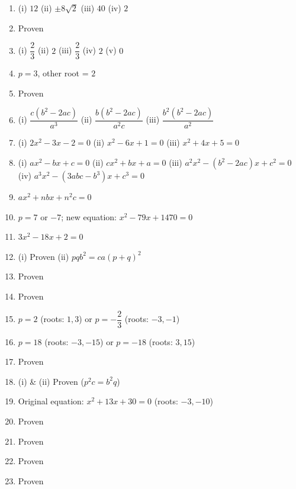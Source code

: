 \documentclass[12pt,a4paper]{article}
\begin{document}
	\begin{enumerate}
		\item (i) $12$ \quad (ii) $\pm 8\sqrt{2}$ \quad (iii) $40$ \quad (iv) $2$
		\item Proven
		\item (i) $\dfrac{2}{3}$ \quad (ii) $2$ \quad (iii) $\dfrac{2}{3}$ \quad (iv) $2$ \quad (v) $0$
		\item $p = 3$, other root = $2$
		\item Proven
		\item (i) $\dfrac{c(b^2 - 2ac)}{a^3}$ \quad (ii) $\dfrac{b(b^2 - 2ac)}{a^2c}$ \quad (iii) $\dfrac{b^2(b^2 - 2ac)}{a^2}$
		\item (i) $2x^2 - 3x - 2 = 0$ \quad (ii) $x^2 - 6x + 1 = 0$ \quad (iii) $x^2 + 4x + 5 = 0$
		\item (i) $ax^2 - bx + c = 0$ \quad (ii) $cx^2 + bx + a = 0$ \quad (iii) $a^2x^2 - (b^2 - 2ac)x + c^2 = 0$ \quad (iv) $a^3x^2 - (3abc - b^3)x + c^3 = 0$
		\item $ax^2 + nbx + n^2c = 0$
		\item $p = 7$ or $-7$; new equation: $x^2 - 79x + 1470 = 0$
		\item $3x^2 - 18x + 2 = 0$
		\item (i) Proven \quad (ii) $pqb^2 = ca(p + q)^2$
		\item Proven
		\item Proven
		\item $p = 2$ (roots: $1, 3$) or $p = -\dfrac{2}{3}$ (roots: $-3, -1$)
		\item $p = 18$ (roots: $-3, -15$) or $p = -18$ (roots: $3, 15$)
		\item Proven
		\item (i) \& (ii) Proven ($p^2c = b^2q$)
		\item Original equation: $x^2 + 13x + 30 = 0$ (roots: $-3, -10$)
		\item Proven
		\item Proven
		\item Proven
		\item Proven
	\end{enumerate}
\end{document}
